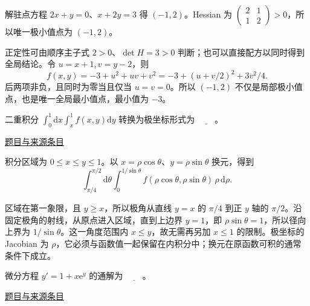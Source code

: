\documentclass[12pt,fontset=fandol]{ctexart}
\begin{document}
\begin{solve}\label{ans:fin16-high:2}

解驻点方程 $2x+y=0$、$x+2y=3$ 得 $(-1,2)$。Hessian 为 $\begin{pmatrix}2&1\\1&2\end{pmatrix}>0$，所以唯一极小值点为 $\boxed{(-1,2)}$。

正定性可由顺序主子式 $2>0$、$\det H=3>0$ 判断；也可以直接配方以同时得到全局结论。令 $u=x+1,v=y-2$，则
\[
f(x,y)=-3+u^2+uv+v^2=-3+(u+v/2)^2+3v^2/4.
\]
后两项非负，且同时为零当且仅当 $u=v=0$。所以 $(-1,2)$ 不仅是局部极小值点，也是唯一全局最小值点，最小值为 $-3$。

\end{solve}

\begin{example}[来源序号3]\label{ex:fin16-high:3}\label{pr:fin16-high:3}

二重积分 $\int_0^1 \mathrm{d}x \int_x^1 f(x,y) \mathrm{d}y$ 转换为极坐标形式为 $\underline{\qquad}$。

\par\href{https://github.com/lzxcr/cmc-mathematics/blob/64916fa1fdbc3e444a652eca204d5669058ee321/src/problems/finals/16/03.md}{题目与来源条目}

\end{example}

\begin{solve}\label{ans:fin16-high:3}

积分区域为 $0\le x\le y\le1$。以 $x=\rho\cos\theta$、$y=\rho\sin\theta$ 换元，得到
\[
\boxed{\int_{\pi/4}^{\pi/2}\mathrm d\theta
\int_0^{1/\sin\theta}f(\rho\cos\theta,\rho\sin\theta)\,\rho\,\mathrm d\rho}.
\]

区域在第一象限，且 $y\ge x$，所以极角从直线 $y=x$ 的 $\pi/4$ 到正 $y$ 轴的 $\pi/2$。沿固定极角的射线，从原点进入区域，直到上边界 $y=1$，即 $\rho\sin\theta=1$，所以径向上界为 $1/\sin\theta$。这一角度范围内 $x\le y$，故无需再另加 $x\le1$ 的限制。极坐标的 Jacobian 为 $\rho$，它必须与函数值一起保留在内积分中；换元在原函数可积的通常条件下成立。

\end{solve}

\begin{example}[来源序号4]\label{ex:fin16-high:4}\label{pr:fin16-high:4}

微分方程 $y' = 1 + x \mathrm{e}^{y}$ 的通解为 $\underline{\qquad}$。

\par\href{https://github.com/lzxcr/cmc-mathematics/blob/64916fa1fdbc3e444a652eca204d5669058ee321/src/problems/finals/16/04.md}{题目与来源条目}

\end{example}
\end{document}
